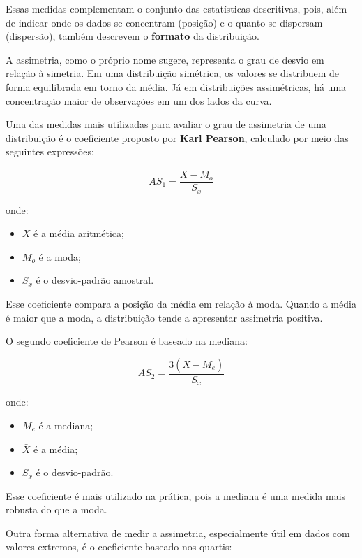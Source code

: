 Essas medidas complementam o conjunto das estatísticas descritivas, pois,
além de indicar onde os dados se concentram (posição) e o quanto se dispersam
(dispersão), também descrevem o \textbf{formato} da distribuição. \vskip0.3cm

A assimetria, como o próprio nome sugere, representa o grau de desvio em
relação à simetria. Em uma distribuição simétrica, os valores se distribuem
de forma equilibrada em torno da média. Já em distribuições assimétricas,
há uma concentração maior de observações em um dos lados da curva. \vskip0.3cm

Uma das medidas mais utilizadas para avaliar o grau de assimetria de uma
distribuição é o coeficiente proposto por \textbf{Karl Pearson}, calculado
por meio das seguintes expressões:

\begin{equation}\label{eq:assimetria1}
AS_1 = \frac{\bar{X} - M_o}{S_x}
\end{equation}

onde:

\begin{itemize}
    \item $\bar{X}$ é a média aritmética;
    \item $M_o$ é a moda;
    \item $S_x$ é o desvio-padrão amostral.
\end{itemize}

Esse coeficiente compara a posição da média em relação à moda. Quando a média
é maior que a moda, a distribuição tende a apresentar assimetria positiva.  \vskip0.3cm


O segundo coeficiente de Pearson é baseado na mediana:

\begin{equation}\label{eq:assimetria2}
AS_2 = \frac{3(\bar{X} - M_e)}{S_x}
\end{equation}

\newpage
onde:
\begin{itemize}
    \item $M_e$ é a mediana;
    \item $\bar{X}$ é a média;
    \item $S_x$ é o desvio-padrão.
\end{itemize}

Esse coeficiente é mais utilizado na prática, pois a mediana é uma medida
mais robusta do que a moda. \vskip0.3cm

Outra forma alternativa de medir a assimetria, especialmente útil em dados
com valores extremos, é o coeficiente baseado nos quartis:

